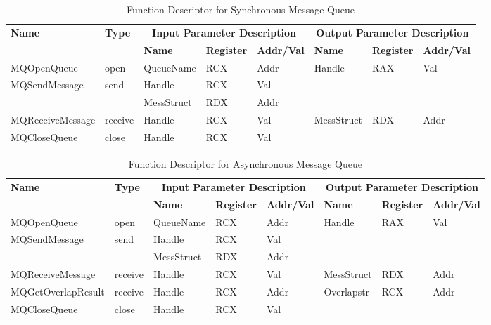 \begin{table}[H]
  \centering
  \caption{Function Descriptor for Synchronous Message Queue}
  \label{msmqsynfunctions}
\begin{tabular}{|l|l|l|l|l|l|l|l|}
\hline
             \multirow{2}{*}{{\textbf{Name}}} & \multirow{2}{*}{{\textbf{Type}}} & \multicolumn{3}{c|}{\textbf{Input Parameter Description}} & \multicolumn{3}{c|}{\textbf{Output Parameter Description}} \\
              \cline{3-8} 
             & & \textbf{Name}& \textbf{Register} & \textbf{Addr/Val} & \textbf{Name}& \textbf{Register} &  \textbf{Addr/Val}  \\
             \hline
      MQOpenQueue
       &open & QueueName & RCX  & Addr &  Handle & RAX & Val\\
      \hline                     
      \multirow{2}{*}{MQSendMessage}
       &\multirow{2}{*}{send} &  Handle & RCX & Val &  &  & \\
       \cline{3-5}
      & & MessStruct& RDX&Addr &  &  & \\
      \hline            
      MQReceiveMessage
       &receive&  Handle & RCX & Val& MessStruct& RDX&Addr\\
      \hline       
      MQCloseQueue &
       close &  Handle & RCX & Val & & &\\
      \hline                          
  \end{tabular}   
\end{table}

\begin{table}[H]
  \centering
  \caption{Function Descriptor for Asynchronous Message Queue}
  \label{msmqasynfunctions}
\begin{tabular}{|l|l|l|l|l|l|l|l|}
\hline
             \multirow{2}{*}{{\textbf{Name}}} & \multirow{2}{*}{{\textbf{Type}}} & \multicolumn{3}{c|}{\textbf{Input Parameter Description}} & \multicolumn{3}{c|}{\textbf{Output Parameter Description}} \\
              \cline{3-8} 
             & & \textbf{Name}& \textbf{Register} & \textbf{Addr/Val} & \textbf{Name}& \textbf{Register} &  \textbf{Addr/Val}  \\
             \hline
      MQOpenQueue
       &open & QueueName & RCX  & Addr &  Handle & RAX & Val\\
      \hline                     
      \multirow{2}{*}{MQSendMessage}
       &\multirow{2}{*}{send} &  Handle & RCX & Val &  &  & \\
       \cline{3-5}
      & & MessStruct& RDX&Addr &  &  & \\
      \hline            
      MQReceiveMessage
       &receive&  Handle & RCX & Val& MessStruct& RDX&Addr\\
      \hline    
      MQGetOverlapResult &
       receive &  Handle & RCX & Addr & Overlapstr& RCX&Addr\\
      \hline      
      MQCloseQueue &
       close &  Handle & RCX & Val & & &\\
      \hline                          
  \end{tabular}   
\end{table}


